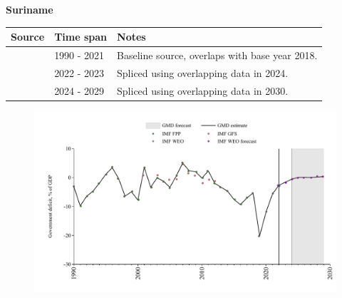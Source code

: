 \documentclass[12pt,a4paper,landscape]{article}
\begin{document}
\begin{adjustbox}{max totalsize={\paperwidth}{\paperheight},center}
\begin{minipage}[t][\textheight][t]{\textwidth}
\vspace*{0.5cm}
{}
\begin{center}
{\Large\bfseries Suriname}
\end{center}
\vspace{0.5cm}
\begin{table}[H]
\centering
\small
\begin{tabular}{|l|l|l|}
\hline
\textbf{Source} & \textbf{Time span} & \textbf{Notes} \\
\hline
\rowcolor{white}\cite{IMF_WEO}& 1990 - 2021 &Baseline source, overlaps with base year 2018.\\
\rowcolor{lightgray}\cite{IMF_FPP}& 2022 - 2023 &Spliced using overlapping data in 2024.\\
\rowcolor{white}\cite{IMF_WEO_forecast}& 2024 - 2029 &Spliced using overlapping data in 2030.\\
\hline
\end{tabular}
\end{table}
\begin{figure}[H]
\centering
\includegraphics[width=\textwidth,height=0.6\textheight,keepaspectratio]{graphs/SUR_govdef_GDP.pdf}
\end{figure}
\end{minipage}
\end{adjustbox}
\end{document}
